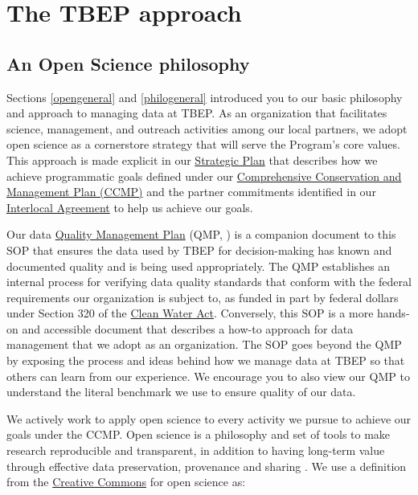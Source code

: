\documentclass[
]{book}
\begin{document}
\hypertarget{tbepapproach}{%
\section{The TBEP approach}\label{tbepapproach}}

\hypertarget{philo}{%
\subsection{An Open Science philosophy}\label{philo}}

Sections \ref{opengeneral} and \ref{philogeneral} introduced you to our basic philosophy and approach to managing data at TBEP. As an organization that facilitates science, management, and outreach activities among our local partners, we adopt open science as a cornerstore strategy that will serve the Program's core values. This approach is made explicit in our \href{https://drive.google.com/file/d/11xohuoaHDxNHRqgXoOHdI37FpWvac_rn/view?usp=sharing}{Strategic Plan} that describes how we achieve programmatic goals defined under our \href{https://ccmp.tbep.org}{Comprehensive Conservation and Management Plan (CCMP)} and the partner commitments identified in our \href{https://drive.google.com/file/d/1iJcWxmc5SeyDTqiCQ3MLQGWEY_EDGtZT/view?usp=sharing}{Interlocal Agreement} to help us achieve our goals.

Our data \href{https://drive.google.com/file/d/1DyA0PNHV8rEXGMwGiyS7sXY1ECLYpJJO/view}{Quality Management Plan} (QMP, \citet{tbep1620}) is a companion document to this SOP that ensures the data used by TBEP for decision-making has known and documented quality and is being used appropriately. The QMP establishes an internal process for verifying data quality standards that conform with the federal requirements our organization is subject to, as funded in part by federal dollars under Section 320 of the \href{https://www.epa.gov/laws-regulations/summary-clean-water-act}{Clean Water Act}. Conversely, this SOP is a more hands-on and accessible document that describes a how-to approach for data management that we adopt as an organization. The SOP goes beyond the QMP by exposing the process and ideas behind how we manage data at TBEP so that others can learn from our experience. We encourage you to also view our QMP to understand the literal benchmark we use to ensure quality of our data.

We actively work to apply open science to every activity we pursue to achieve our goals under the CCMP. Open science is a philosophy and set of tools to make research reproducible and transparent, in addition to having long-term value through effective data preservation, provenance and sharing \citep{Beck20}. We use a definition from the \href{https://creativecommons.org/about/program-areas/open-science/}{Creative Commons} for open science as:
\end{document}
